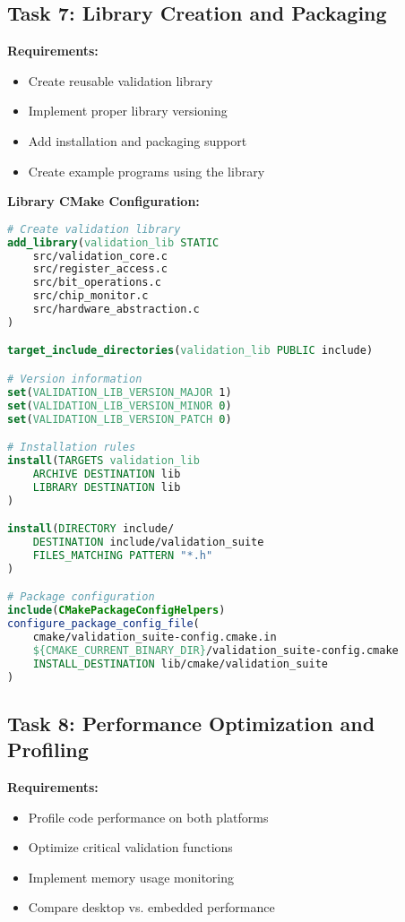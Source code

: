 \documentclass[11pt,a4paper]{article}
\begin{document}
\subsection{Task 7: Library Creation and Packaging}

\textbf{Requirements:}
\begin{itemize}
    \item Create reusable validation library
    \item Implement proper library versioning
    \item Add installation and packaging support
    \item Create example programs using the library
\end{itemize}

\textbf{Library CMake Configuration:}
\begin{lstlisting}[language=cmake]
# Create validation library
add_library(validation_lib STATIC
    src/validation_core.c
    src/register_access.c
    src/bit_operations.c
    src/chip_monitor.c
    src/hardware_abstraction.c
)

target_include_directories(validation_lib PUBLIC include)

# Version information
set(VALIDATION_LIB_VERSION_MAJOR 1)
set(VALIDATION_LIB_VERSION_MINOR 0)
set(VALIDATION_LIB_VERSION_PATCH 0)

# Installation rules
install(TARGETS validation_lib
    ARCHIVE DESTINATION lib
    LIBRARY DESTINATION lib
)

install(DIRECTORY include/
    DESTINATION include/validation_suite
    FILES_MATCHING PATTERN "*.h"
)

# Package configuration
include(CMakePackageConfigHelpers)
configure_package_config_file(
    cmake/validation_suite-config.cmake.in
    ${CMAKE_CURRENT_BINARY_DIR}/validation_suite-config.cmake
    INSTALL_DESTINATION lib/cmake/validation_suite
)
\end{lstlisting}

\subsection{Task 8: Performance Optimization and Profiling}

\textbf{Requirements:}
\begin{itemize}
    \item Profile code performance on both platforms
    \item Optimize critical validation functions
    \item Implement memory usage monitoring
    \item Compare desktop vs. embedded performance
\end{itemize}
\end{document}
